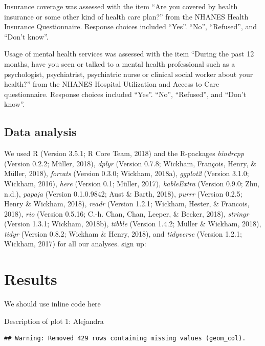 \documentclass[man]{apa6}
\begin{document}
Insurance coverage was assessed with the item \enquote{Are you covered
by health insurance or some other kind of health care plan?} from the
NHANES Health Insurance Questionnaire. Response choices included
\enquote{Yes}. \enquote{No}, \enquote{Refused}, and \enquote{Don't
know}.

Usage of mental health services was assessed with the item
\enquote{During the past 12 months, have you seen or talked to a mental
health professional such as a psychologist, psychiatrist, psychiatric
nurse or clinical social worker about your health?} from the NHANES
Hospital Utilization and Access to Care questionnaire. Response choices
included \enquote{Yes}. \enquote{No}, \enquote{Refused}, and
\enquote{Don't know}.

\subsection{Data analysis}\label{data-analysis}

We used R (Version 3.5.1; R Core Team, 2018) and the R-packages
\emph{bindrcpp} (Version 0.2.2; Müller, 2018), \emph{dplyr} (Version
0.7.8; Wickham, François, Henry, \& Müller, 2018), \emph{forcats}
(Version 0.3.0; Wickham, 2018a), \emph{ggplot2} (Version 3.1.0; Wickham,
2016), \emph{here} (Version 0.1; Müller, 2017), \emph{kableExtra}
(Version 0.9.0; Zhu, n.d.), \emph{papaja} (Version 0.1.0.9842; Aust \&
Barth, 2018), \emph{purrr} (Version 0.2.5; Henry \& Wickham, 2018),
\emph{readr} (Version 1.2.1; Wickham, Hester, \& Francois, 2018),
\emph{rio} (Version 0.5.16; C.-h. Chan, Chan, Leeper, \& Becker, 2018),
\emph{stringr} (Version 1.3.1; Wickham, 2018b), \emph{tibble} (Version
1.4.2; Müller \& Wickham, 2018), \emph{tidyr} (Version 0.8.2; Wickham \&
Henry, 2018), and \emph{tidyverse} (Version 1.2.1; Wickham, 2017) for
all our analyses. sign up:

\section{Results}\label{results}

We should use inline code here

Description of plot 1: Alejandra

\begin{verbatim}
## Warning: Removed 429 rows containing missing values (geom_col).
\end{verbatim}
\end{document}

